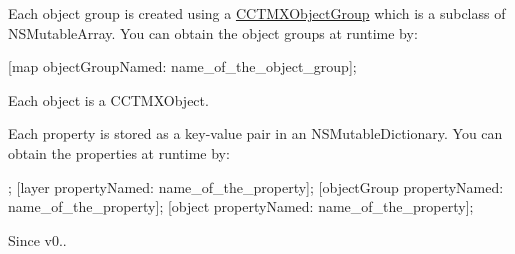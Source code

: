 Each object group is created using a \hyperlink{interface_c_c_t_m_x_object_group}{C\-C\-T\-M\-X\-Object\-Group} which is a subclass of N\-S\-Mutable\-Array. You can obtain the object groups at runtime by\-:
\begin{DoxyItemize}
\item \mbox{[}map object\-Group\-Named\-: name\-\_\-of\-\_\-the\-\_\-object\-\_\-group\mbox{]};
\end{DoxyItemize}

Each object is a C\-C\-T\-M\-X\-Object.

Each property is stored as a key-\/value pair in an N\-S\-Mutable\-Dictionary. You can obtain the properties at runtime by\-: \begin{DoxyVerb}         ;
         [layer propertyNamed: name_of_the_property];
         [objectGroup propertyNamed: name_of_the_property];
         [object propertyNamed: name_of_the_property];\end{DoxyVerb}
 \begin{DoxySince}{Since}
v0.. 
\end{DoxySince}



